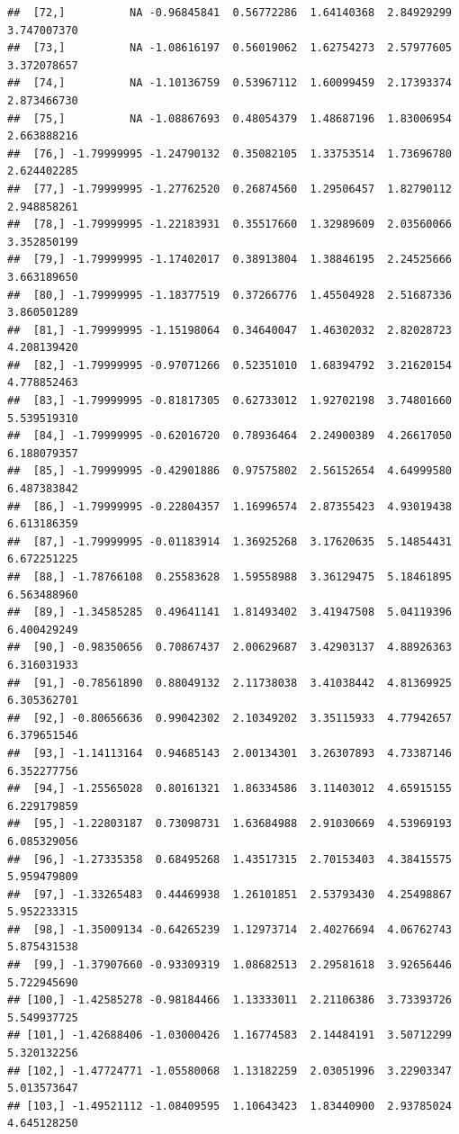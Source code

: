 \documentclass{article}\usepackage[]{graphicx}\usepackage[]{color}
\makeatletter
\newenvironment{kframe}{%
 \def\at@end@of@kframe{}%
 \ifinner\ifhmode%
  \def\at@end@of@kframe{\end{minipage}}%
  \begin{minipage}{\columnwidth}%
 \fi\fi%
 \def\FrameCommand##1{\hskip\@totalleftmargin \hskip-\fboxsep
 \colorbox{shadecolor}{##1}\hskip-\fboxsep
     \hskip-\linewidth \hskip-\@totalleftmargin \hskip\columnwidth}%
 \MakeFramed {\advance\hsize-\width
   \@totalleftmargin\z@ \linewidth\hsize
   \@setminipage}}%
 {\par\unskip\endMakeFramed%
 \at@end@of@kframe}
\newenvironment{knitrout}{}{} %
\makeatother
\begin{document}
\begin{knitrout}
\begin{kframe}
\begin{verbatim}
##  [72,]          NA -0.96845841  0.56772286  1.64140368  2.84929299  3.747007370
##  [73,]          NA -1.08616197  0.56019062  1.62754273  2.57977605  3.372078657
##  [74,]          NA -1.10136759  0.53967112  1.60099459  2.17393374  2.873466730
##  [75,]          NA -1.08867693  0.48054379  1.48687196  1.83006954  2.663888216
##  [76,] -1.79999995 -1.24790132  0.35082105  1.33753514  1.73696780  2.624402285
##  [77,] -1.79999995 -1.27762520  0.26874560  1.29506457  1.82790112  2.948858261
##  [78,] -1.79999995 -1.22183931  0.35517660  1.32989609  2.03560066  3.352850199
##  [79,] -1.79999995 -1.17402017  0.38913804  1.38846195  2.24525666  3.663189650
##  [80,] -1.79999995 -1.18377519  0.37266776  1.45504928  2.51687336  3.860501289
##  [81,] -1.79999995 -1.15198064  0.34640047  1.46302032  2.82028723  4.208139420
##  [82,] -1.79999995 -0.97071266  0.52351010  1.68394792  3.21620154  4.778852463
##  [83,] -1.79999995 -0.81817305  0.62733012  1.92702198  3.74801660  5.539519310
##  [84,] -1.79999995 -0.62016720  0.78936464  2.24900389  4.26617050  6.188079357
##  [85,] -1.79999995 -0.42901886  0.97575802  2.56152654  4.64999580  6.487383842
##  [86,] -1.79999995 -0.22804357  1.16996574  2.87355423  4.93019438  6.613186359
##  [87,] -1.79999995 -0.01183914  1.36925268  3.17620635  5.14854431  6.672251225
##  [88,] -1.78766108  0.25583628  1.59558988  3.36129475  5.18461895  6.563488960
##  [89,] -1.34585285  0.49641141  1.81493402  3.41947508  5.04119396  6.400429249
##  [90,] -0.98350656  0.70867437  2.00629687  3.42903137  4.88926363  6.316031933
##  [91,] -0.78561890  0.88049132  2.11738038  3.41038442  4.81369925  6.305362701
##  [92,] -0.80656636  0.99042302  2.10349202  3.35115933  4.77942657  6.379651546
##  [93,] -1.14113164  0.94685143  2.00134301  3.26307893  4.73387146  6.352277756
##  [94,] -1.25565028  0.80161321  1.86334586  3.11403012  4.65915155  6.229179859
##  [95,] -1.22803187  0.73098731  1.63684988  2.91030669  4.53969193  6.085329056
##  [96,] -1.27335358  0.68495268  1.43517315  2.70153403  4.38415575  5.959479809
##  [97,] -1.33265483  0.44469938  1.26101851  2.53793430  4.25498867  5.952233315
##  [98,] -1.35009134 -0.64265239  1.12973714  2.40276694  4.06762743  5.875431538
##  [99,] -1.37907660 -0.93309319  1.08682513  2.29581618  3.92656446  5.722945690
## [100,] -1.42585278 -0.98184466  1.13333011  2.21106386  3.73393726  5.549937725
## [101,] -1.42688406 -1.03000426  1.16774583  2.14484191  3.50712299  5.320132256
## [102,] -1.47724771 -1.05580068  1.13182259  2.03051996  3.22903347  5.013573647
## [103,] -1.49521112 -1.08409595  1.10643423  1.83440900  2.93785024  4.645128250

\end{verbatim}
\end{kframe}
\end{knitrout}
\end{document}
